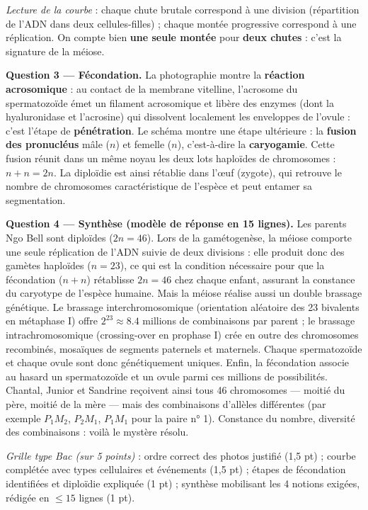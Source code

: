 \documentclass[11pt]{article}
\begin{document}
\begin{exoresolu}
\emph{Lecture de la courbe} : chaque chute brutale correspond à une division (répartition de l'ADN dans deux cellules-filles) ; chaque montée progressive correspond à une réplication. On compte bien \textbf{une seule montée} pour \textbf{deux chutes} : c'est la signature de la méiose.

\textbf{Question 3 --- Fécondation.} La photographie montre la \textbf{réaction acrosomique} : au contact de la membrane vitelline, l'acrosome du spermatozoïde émet un filament acrosomique et libère des enzymes (dont la hyaluronidase et l'acrosine) qui dissolvent localement les enveloppes de l'ovule : c'est l'étape de \textbf{pénétration}. Le schéma montre une étape ultérieure : la \textbf{fusion des pronucléus} mâle ($n$) et femelle ($n$), c'est-à-dire la \textbf{caryogamie}. Cette fusion réunit dans un même noyau les deux lots haploïdes de chromosomes : $n + n = 2n$. La diploïdie est ainsi rétablie dans l'œuf (zygote), qui retrouve le nombre de chromosomes caractéristique de l'espèce et peut entamer sa segmentation.

\textbf{Question 4 --- Synthèse (modèle de réponse en 15 lignes).} Les parents Ngo Bell sont diploïdes ($2n = 46$). Lors de la gamétogenèse, la méiose comporte une seule réplication de l'ADN suivie de deux divisions : elle produit donc des gamètes haploïdes ($n = 23$), ce qui est la condition nécessaire pour que la fécondation ($n + n$) rétablisse $2n = 46$ chez chaque enfant, assurant la constance du caryotype de l'espèce humaine. Mais la méiose réalise aussi un double brassage génétique. Le brassage interchromosomique (orientation aléatoire des 23 bivalents en métaphase I) offre $2^{23} \approx \num{8,4}$ millions de combinaisons par parent ; le brassage intrachromosomique (crossing-over en prophase I) crée en outre des chromosomes recombinés, mosaïques de segments paternels et maternels. Chaque spermatozoïde et chaque ovule sont donc génétiquement uniques. Enfin, la fécondation associe au hasard un spermatozoïde et un ovule parmi ces millions de possibilités. Chantal, Junior et Sandrine reçoivent ainsi tous 46 chromosomes --- moitié du père, moitié de la mère --- mais des combinaisons d'allèles différentes (par exemple $P_1M_2$, $P_2M_1$, $P_1M_1$ pour la paire n° 1). Constance du nombre, diversité des combinaisons : voilà le mystère résolu.

\emph{Grille type Bac (sur 5 points)} : ordre correct des photos justifié (1,5 pt) ; courbe complétée avec types cellulaires et événements (1,5 pt) ; étapes de fécondation identifiées et diploïdie expliquée (1 pt) ; synthèse mobilisant les 4 notions exigées, rédigée en $\leq 15$ lignes (1 pt).
\end{exoresolu}
\end{document}
